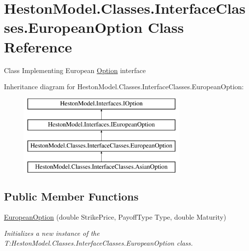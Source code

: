 \hypertarget{class_heston_model_1_1_classes_1_1_interface_classes_1_1_european_option}{}\section{Heston\+Model.\+Classes.\+Interface\+Classes.\+European\+Option Class Reference}
\label{class_heston_model_1_1_classes_1_1_interface_classes_1_1_european_option}


Class Implementing European \mbox{\hyperlink{class_heston_model_1_1_classes_1_1_interface_classes_1_1_option}{Option}} interface  


Inheritance diagram for Heston\+Model.\+Classes.\+Interface\+Classes.\+European\+Option\+:\begin{figure}[H]
\begin{center}
\leavevmode
\includegraphics[height=4.000000cm]{class_heston_model_1_1_classes_1_1_interface_classes_1_1_european_option}
\end{center}
\end{figure}
\subsection*{Public Member Functions}
\begin{DoxyCompactItemize}
\item 
\mbox{\hyperlink{class_heston_model_1_1_classes_1_1_interface_classes_1_1_european_option_a05fdc2d4efcb2c5b6364e2daa409d891}{European\+Option}} (double Strike\+Price, Payoff\+Type Type, double Maturity)
\begin{DoxyCompactList}\small\item\em Initializes a new instance of the T\+:\+Heston\+Model.\+Classes.\+Interface\+Classes.\+European\+Option class. \end{DoxyCompactList}\end{DoxyCompactItemize}
